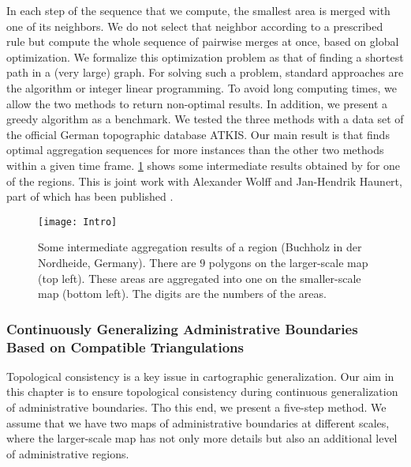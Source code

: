 In each step of the sequence that we compute, 
the smallest area is merged with one of its neighbors. 
We do not select that neighbor according to a prescribed rule 
but compute the whole sequence of pairwise merges at once, 
based on global optimization.
We formalize this optimization problem as that of 
finding a shortest path in a (very large) graph.
For solving such a problem, standard approaches
are the \Astar algorithm or integer linear programming.
To avoid long computing times, we allow the two methods to 
return non-optimal results.
In addition, we present a greedy algorithm 
as a benchmark.
We tested the three methods with a
data set of the official German topographic database ATKIS.
Our main result is that
\Astar finds optimal aggregation sequences for more instances 
than the other two methods
within a given time frame.
\fig\ref{fig:Intro_AreaAgg_Case612} shows some intermediate 
results obtained by \Astar for one of the regions.
This is joint work with Alexander Wolff and Jan-Hendrik Haunert,
part of which has been published \cite{Peng2017AStar}.


\begin{figure}[tb]
	\centering
	\texttt{[image: Intro]}
	\caption{Some intermediate aggregation results of 
		a region (Buchholz in der Nordheide, Germany). 
		There are $9$ polygons on 
		the larger-scale map (top left). 
		These areas are aggregated into one 
		on the smaller-scale map (bottom left). 
		The digits are the numbers of the areas.
}
	\label{fig:Intro_AreaAgg_Case612}
\end{figure}

\subsubsection{Continuously Generalizing Administrative Boundaries\\
	Based on Compatible Triangulations}

Topological consistency is a key issue 
in cartographic generalization.
Our aim in this chapter is to ensure topological consistency  
during continuous generalization of administrative boundaries.
Tho this end, we present a five-step method.
We assume that we have two maps of administrative
boundaries at different scales, where the larger-scale map has 
not
only more details but also an additional level of administrative
regions.

